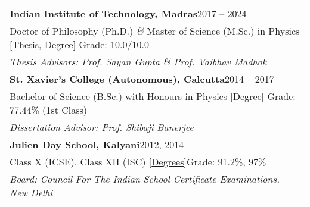 
\noindent
\begin{tabular}{@{} m{18.5cm}}
\textbf{Indian Institute of Technology, Madras}\hfill 2017 -- 2024\\
Doctor of Philosophy (Ph.D.) \textit{\&} Master of Science (M.Sc.) in Physics [\href{https://shodhganga.inflibnet.ac.in/handle/10603/609844}{Thesis}, \href{https://drive.google.com/file/d/1e_EdV3adnDxSkRCMAQGF4_j8DAEQHmok/view?usp=sharing}{Degree}] \hfill Grade: 10.0/10.0\\
\textit{Thesis Advisors: Prof. Sayan Gupta \& Prof. Vaibhav Madhok}\\[0.3cm]

\textbf{St. Xavier's College (Autonomous), Calcutta}\hfill 2014 -- 2017\\
Bachelor of Science (B.Sc.) with Honours in Physics [\href{https://drive.google.com/file/d/1kzH1EiCFbbcnvpbOTWJMMhiCC53tkvDD/view?usp=sharing}{Degree}] \hfill Grade: 77.44\% (1st Class)\\
\textit{Dissertation Advisor: Prof. Shibaji Banerjee}\\[0.3cm]

\textbf{Julien Day School, Kalyani}\hfill 2012, 2014\\
Class X (ICSE), Class XII (ISC) [\href{https://drive.google.com/file/d/1rBzB5cY0d9NKxEajnIj6dx8uzIBc41sh/view?usp=sharing}{Degrees}]\hfill Grade: 91.2\%, 97\%\\
\textit{Board: Council For The Indian School Certificate Examinations, New Delhi}
\end{tabular}